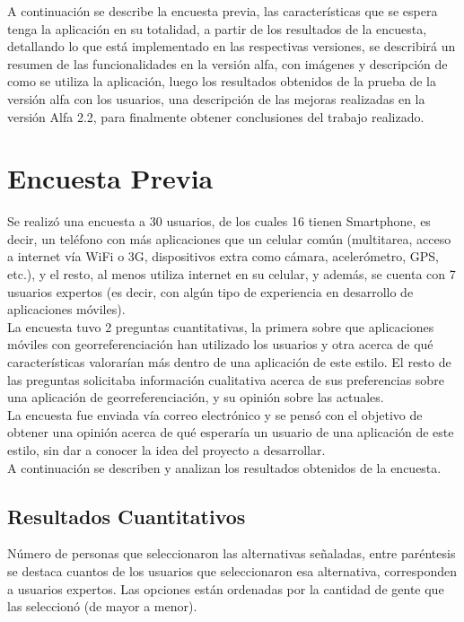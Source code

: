 \documentclass[10pt,letterpaper]{article}
\begin{document}
A continuación se describe la encuesta previa, las características que se espera tenga la aplicación en su totalidad, a partir de los resultados de la encuesta, detallando lo que está implementado en las respectivas versiones, se describirá un resumen de las funcionalidades en la versión alfa, con imágenes y descripción de como se utiliza la aplicación, luego los resultados obtenidos de la prueba de la versión alfa con los usuarios, una descripción de las mejoras realizadas en la versión Alfa 2.2, para finalmente obtener conclusiones del trabajo realizado.\\

\newpage
\section{Encuesta Previa}

Se realizó una encuesta a 30 usuarios, de los cuales 16 tienen Smartphone, es decir, un teléfono con más aplicaciones que un celular común (multitarea, acceso a internet vía WiFi o 3G, dispositivos extra como cámara, acelerómetro, GPS, etc.), y el resto, al menos utiliza internet en su celular, y además, se cuenta con 7 usuarios expertos (es decir, con algún tipo de experiencia en desarrollo de aplicaciones móviles).\\

La encuesta tuvo 2 preguntas cuantitativas, la primera sobre que aplicaciones móviles con georreferenciación han utilizado los usuarios y otra acerca de qué características valorarían más dentro de una aplicación de este estilo. El resto de las preguntas solicitaba información cualitativa acerca de sus preferencias sobre una aplicación de georreferenciación, y su opinión sobre las actuales.\\

La encuesta fue enviada vía correo electrónico y se pensó con el objetivo de obtener una opinión acerca de qué esperaría un usuario de una aplicación de este estilo, sin dar a conocer la idea del proyecto a desarrollar.\\

A continuación se describen y analizan los resultados obtenidos de la encuesta.\\

\subsection{Resultados Cuantitativos}

Número de personas que seleccionaron las alternativas señaladas, entre paréntesis se destaca cuantos de los usuarios que seleccionaron esa alternativa, corresponden a usuarios expertos. Las opciones están ordenadas por la cantidad de gente que las seleccionó (de mayor a menor).\\
\end{document}
